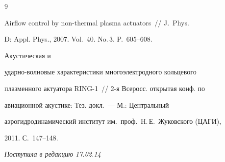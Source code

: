 {\small\frenchspacing


{%




\begin{thebibliography}{9}




 Airflow control by non-thermal plasma actuators~/\!\!/ J.~Phys. 


D: Appl. Phys., 2007. Vol.~40. No.\,3. P.~605--608.




 Акустическая и 


удар\-но-вол\-но\-вые характеристики многоэлектродного кольцевого 


плазменного актуатора RING-1~/\!\!/ 2-я Всеросс. открытая конф. по 


авиационной акустике: Тез. докл.~--- М.: Центральный 


аэрогидродинамический институт им.\ проф.\ Н.\,Е.~Жуковского (ЦАГИ), 


2011. С.~147--148.


\end{thebibliography}


}


}





\hfill{\small\textit{Поступила в редакцию 17.02.14}}




























\newpage





